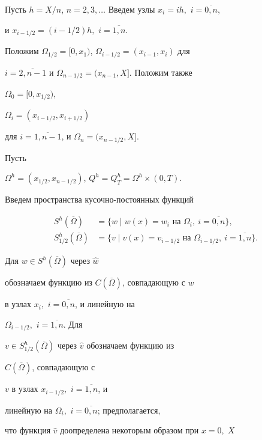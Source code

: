 \documentclass[12pt]{article}
\theoremstyle{plain} %
\theoremstyle{definition}
\numberwithin{equation}{section}
\begin{document}
Пусть $h=X/n$, $n=2,3,\dotsc$ Введем узлы $x_i=ih,$ $i=\overline{0,n}$,


и $x_{i-1/2}=(i-1/2)h,$ $i=\overline{1,n}$.


Положим $\Omega_{1/2}=[0,x_1)$, $\Omega_{i-1/2}=(x_{i-1},x_i)$ для


$i=\overline{2,n-1}$ и $\Omega_{n-1/2}=(x_{n-1},X]$. Положим также


$\Omega_0=[0,x_{1/2})$,


$\Omega_{i}=(x_{i-1/2},x_{i+1/2})$


для $i=\overline{1,n-1}$, и $\Omega_n=(x_{n-1/2},X]$.


Пусть


$\Omega^h= (x_{1/2},x_{n-1/2})$, $Q^h=Q^h_T=\Omega^h\times (0,T)$.





Введем пространства кусочно-постоянных функций


\begin{align*}


S^h(\overline\Omega)&=


\{w\mid w(x)=w_{i}\text{ на }\Omega_{i},


\ i=\overline{0,n}\},\\


%


S^h_{1/2}(\overline\Omega)&=


\{v\mid v(x)=v_{i-1/2}\text{ на }\Omega_{i-1/2},


\ i=\overline{1,n}\}.


\end{align*}





Для $w\in S^h(\overline\Omega)$ через $\widehat w$


обозначаем функцию из $C(\overline\Omega)$, совпадающую с $w$


в узлах $x_i,$ $i=\overline{0,n}$, и линейную на


$\Omega_{i-1/2},$ $i=\overline{1,n}$. Для


$v\in S^h_{1/2}(\overline\Omega)$ через $\widehat v$ обозначаем функцию из


$C(\overline\Omega)$, совпадающую с


$v$ в узлах $x_{i-1/2},$ $i=\overline{1,n}$, и


линейную на $\Omega_i,$ $i=\overline{0,n}$; предполагается,


что функция $\widehat v$ доопределена некоторым образом при $x=0,\;X$
\end{document}
